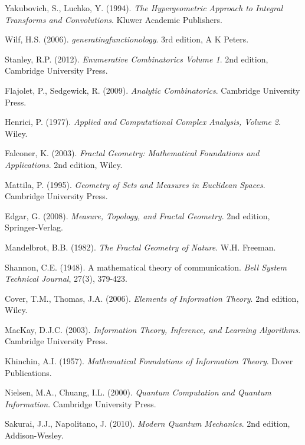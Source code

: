 \documentclass[12pt]{article}
\theoremstyle{plain}
\theoremstyle{definition}
\begin{document}
\begin{thebibliography}{99}
 Yakubovich, S., Luchko, Y. (1994). \emph{The Hypergeometric Approach to Integral Transforms and Convolutions}. Kluwer Academic Publishers.

 Wilf, H.S. (2006). \emph{generatingfunctionology}. 3rd edition, A K Peters.

 Stanley, R.P. (2012). \emph{Enumerative Combinatorics Volume 1}. 2nd edition, Cambridge University Press.

 Flajolet, P., Sedgewick, R. (2009). \emph{Analytic Combinatorics}. Cambridge University Press.

 Henrici, P. (1977). \emph{Applied and Computational Complex Analysis, Volume 2}. Wiley.

 Falconer, K. (2003). \emph{Fractal Geometry: Mathematical Foundations and Applications}. 2nd edition, Wiley.

 Mattila, P. (1995). \emph{Geometry of Sets and Measures in Euclidean Spaces}. Cambridge University Press.

 Edgar, G. (2008). \emph{Measure, Topology, and Fractal Geometry}. 2nd edition, Springer-Verlag.

 Mandelbrot, B.B. (1982). \emph{The Fractal Geometry of Nature}. W.H. Freeman.

 Shannon, C.E. (1948). A mathematical theory of communication. \emph{Bell System Technical Journal}, 27(3), 379-423.

 Cover, T.M., Thomas, J.A. (2006). \emph{Elements of Information Theory}. 2nd edition, Wiley.

 MacKay, D.J.C. (2003). \emph{Information Theory, Inference, and Learning Algorithms}. Cambridge University Press.

 Khinchin, A.I. (1957). \emph{Mathematical Foundations of Information Theory}. Dover Publications.

 Nielsen, M.A., Chuang, I.L. (2000). \emph{Quantum Computation and Quantum Information}. Cambridge University Press.

 Sakurai, J.J., Napolitano, J. (2010). \emph{Modern Quantum Mechanics}. 2nd edition, Addison-Wesley.


\end{thebibliography}
\end{document}
